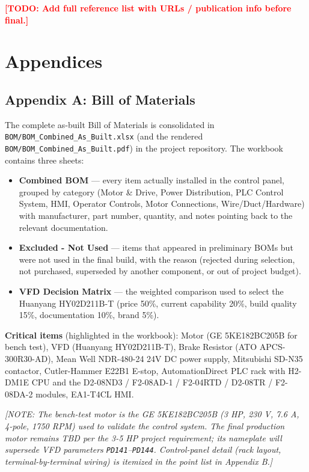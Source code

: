 \documentclass[hidelinks,12pt]{article}
\newcommand{\todo}[1]{\textcolor{red}{\textbf{[TODO: #1]}}}
\newcommand{\note}[1]{\textcolor{PSUblue}{\textit{[NOTE: #1]}}}
\begin{document}
\todo{Add full reference list with URLs / publication info before final.}

\section{Appendices}

\subsection{Appendix A: Bill of Materials}

The complete as-built Bill of Materials is consolidated in \texttt{BOM/BOM\_Combined\_As\_Built.xlsx}
(and the rendered \texttt{BOM/BOM\_Combined\_As\_Built.pdf}) in the project repository. The
workbook contains three sheets:

\begin{itemize}
    \item \textbf{Combined BOM} --- every item actually installed in the control panel,
      grouped by category (Motor \& Drive, Power Distribution, PLC Control System, HMI,
      Operator Controls, Motor Connections, Wire/Duct/Hardware) with manufacturer, part
      number, quantity, and notes pointing back to the relevant documentation.
    \item \textbf{Excluded - Not Used} --- items that appeared in preliminary BOMs but
      were not used in the final build, with the reason (rejected during selection,
      not purchased, superseded by another component, or out of project budget).
    \item \textbf{VFD Decision Matrix} --- the weighted comparison used to select the
      Huanyang HY02D211B-T (price 50\%, current capability 20\%, build quality 15\%,
      documentation 10\%, brand 5\%).
\end{itemize}

\textbf{Critical items} (highlighted in the workbook): Motor (GE 5KE182BC205B for bench
test), VFD (Huanyang HY02D211B-T), Brake Resistor (ATO APCS-300R30-AD), Mean Well
NDR-480-24 24V DC power supply, Mitsubishi SD-N35 contactor, Cutler-Hammer E22B1
E-stop, AutomationDirect PLC rack with H2-DM1E CPU and the D2-08ND3 / F2-08AD-1 /
F2-04RTD / D2-08TR / F2-08DA-2 modules, EA1-T4CL HMI.

\note{The bench-test motor is the GE 5KE182BC205B (3 HP, 230 V, 7.6 A, 4-pole, 1750
RPM) used to validate the control system. The final production motor remains TBD per
the 3-5 HP project requirement; its nameplate will supersede VFD parameters
\texttt{PD141}--\texttt{PD144}. Control-panel detail (rack layout, terminal-by-terminal
wiring) is itemized in the point list in Appendix B.}
\end{document}
